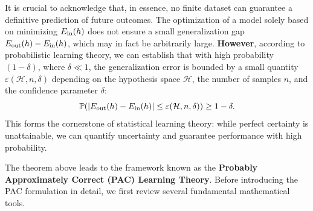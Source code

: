 \documentclass[../main]{subfiles}
\begin{document}
It is crucial to acknowledge that, in essence, no finite dataset can guarantee a definitive prediction of future outcomes.  
The optimization of a model solely based on minimizing $E_{\rm in}(h)$ does not ensure a small generalization gap $E_{\rm out}(h) - E_{\rm in}(h)$, which may in fact be arbitrarily large.  
\textbf{However}, according to probabilistic learning theory, we can establish that with high probability $(1 - \delta)$, where $\delta \ll 1$, the generalization error is bounded by a small quantity $\varepsilon(\mathcal{H}, n, \delta)$ depending on the hypothesis space $\mathcal{H}$, the number of samples $n$, and the confidence parameter $\delta$:  
\begin{equation}
    \mathbb{P}\!\left(
        |E_{\rm out}(h) - E_{\rm in}(h)| \le \varepsilon(\mathcal{H}, n, \delta)
    \right) \ge 1 - \delta.
\end{equation}
This forms the cornerstone of statistical learning theory: while perfect certainty is unattainable, we can quantify uncertainty and guarantee performance with high probability.

The theorem above leads to the framework known as the \textbf{Probably Approximately Correct (PAC) Learning Theory}.  
Before introducing the PAC formulation in detail, we first review several fundamental mathematical tools.
\end{document}
